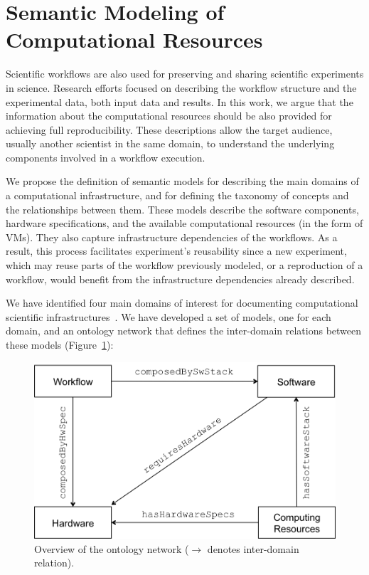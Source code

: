 \section{Semantic Modeling of Computational Resources}
\label{sec:semantic}

Scientific workflows are also used for preserving and sharing scientific experiments 
in science. Research efforts focused on describing the workflow structure and the 
experimental data, both input data and results. In this work, we argue that the information 
about the computational resources should be also provided for achieving full reproducibility. 
These descriptions allow the target audience, usually another scientist in the same domain, 
to understand the underlying components involved in a workflow execution.

We propose the definition of semantic models for describing the main domains of a 
computational infrastructure, and for defining the taxonomy of concepts and the relationships 
between them. These models describe the software components, hardware specifications, 
and the available computational resources (in the form of VMs). They also capture infrastructure 
dependencies of the workflows. As a result, this process facilitates experiment's reusability since 
a new experiment, which may reuse parts of the workflow previously modeled, or a reproduction 
of a workflow, would benefit from the infrastructure dependencies already described.

We have identified four main domains of interest for documenting computational scientific 
infrastructures~\cite{wicus}. We have developed a set of models, one for each domain, 
and an ontology network that defines the inter-domain relations between these models 
(Figure~\ref{fig:wicusrels}):

\begin{figure}[!b]
	\centering
	\includegraphics[width=.9\linewidth]{figures/wicusrels}
	\caption{Overview of the ontology network ($\rightarrow$ denotes inter-domain relation).}
	\label{fig:wicusrels}
\end{figure}

